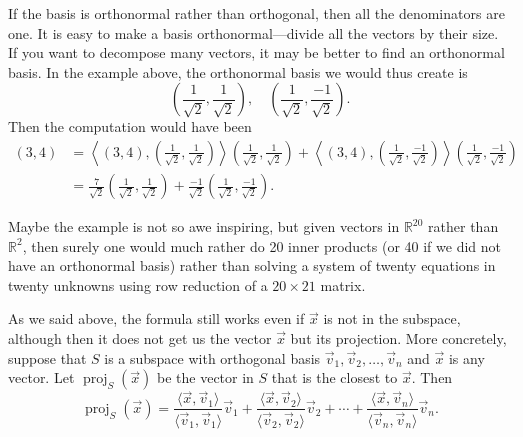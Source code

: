 If the basis is orthonormal rather than orthogonal,
then all the denominators are one.
It is easy to make a basis orthonormal---divide all the vectors by their size.
If you want to decompose many vectors,
it may be better to find an orthonormal basis.
In the example above, the orthonormal basis we would thus create is
\begin{equation*}
\left( \frac{1}{\sqrt{2}} , \frac{1}{\sqrt{2}} \right) , \quad
\left( \frac{1}{\sqrt{2}} , \frac{-1}{\sqrt{2}} \right) .
\end{equation*}
Then the computation would have been
\begin{equation*}
\begin{split}
(3,4)
& =
\left\langle
(3,4)
,
\left( \frac{1}{\sqrt{2}} , \frac{1}{\sqrt{2}} \right)
\right\rangle
\left( \frac{1}{\sqrt{2}} , \frac{1}{\sqrt{2}} \right)
+
\left\langle
(3,4)
,
\left( \frac{1}{\sqrt{2}} , \frac{-1}{\sqrt{2}} \right)
\right\rangle
\left( \frac{1}{\sqrt{2}} , \frac{-1}{\sqrt{2}} \right)
\\
& =
\frac{7}{\sqrt{2}}
\left( \frac{1}{\sqrt{2}} , \frac{1}{\sqrt{2}} \right)
+
\frac{-1}{\sqrt{2}}
\left( \frac{1}{\sqrt{2}} , \frac{-1}{\sqrt{2}} \right) .
\end{split}
\end{equation*}

Maybe the example is not so awe inspiring, but given
vectors in ${\mathbb{R}}^{20}$ rather than ${\mathbb{R}}^2$,
then surely one would much rather do 20 inner products
(or 40 if we did not have an orthonormal basis) rather than
solving a system of twenty equations in twenty unknowns
using row reduction of a $20 \times 21$ matrix.

As we said above, the formula still works even if $\vec{x}$ is not in the
subspace, although then it does not get us the vector $\vec{x}$
but its projection.  More concretely, suppose that $S$ is a subspace
with orthogonal basis
$\vec{v}_1,\vec{v}_2,\ldots,\vec{v}_n$ and $\vec{x}$
is any vector.  Let $\operatorname{proj}_{S}(\vec{x})$ be the vector in $S$
that is the closest to $\vec{x}$.  Then
\begin{equation*}
\operatorname{proj}_{S}(\vec{x}) =
\frac{\langle \vec{x}, \vec{v}_1 \rangle}{
\langle \vec{v}_1, \vec{v}_1 \rangle
}
\vec{v}_1
+
\frac{\langle \vec{x}, \vec{v}_2 \rangle}{
\langle \vec{v}_2, \vec{v}_2 \rangle
}
\vec{v}_2
+
\cdots
+
\frac{\langle \vec{x}, \vec{v}_n \rangle}{
\langle \vec{v}_n, \vec{v}_n \rangle
}
\vec{v}_n .
\end{equation*}

